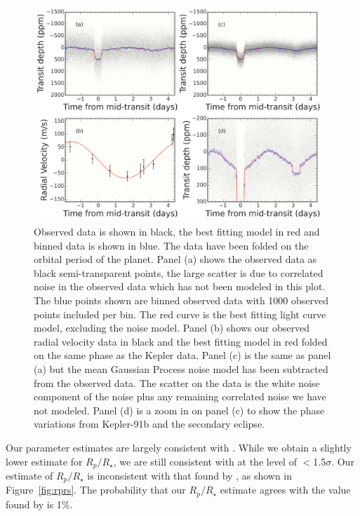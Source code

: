\documentclass[apjl]{emulateapj}
\begin{document}
\begin{figure}
\includegraphics[width=0.97\textwidth]{transitplot_4p.pdf}
\caption{Observed data is shown in black, the best fitting model in red and binned data is shown in blue. The data have been folded on the orbital period of the planet. Panel (a) shows the observed data as black semi-transparent points, the large scatter is due to correlated noise in the observed data which has not been modeled in this plot. The blue points shown are binned observed data with 1000 observed points included per bin. The red curve is the best fitting light curve model, excluding the noise model. Panel (b) shows our observed radial velocity data in black and the best fitting model in red folded on the same phase as the Kepler data. Panel (c) is the same as panel (a) but the mean Gaussian Process noise model has been subtracted from the observed data. The scatter on the data is the white noise component of the noise plus any remaining correlated noise we have not modeled. Panel (d) is a zoom in on panel (c) to show the phase variations from Kepler-91b and the secondary eclipse.}
\label{fig:results}
\end{figure}


Our parameter estimates are largely consistent with \citet{lillo14}. While we obtain a slightly lower estimate for $R_{p}/R_{\star}$, we are still consistent with \citet{lillo14} at the level of $<$1.5$\sigma$. Our estimate of $R_{p}/R_{\star}$ is inconsistent with that found by \citet{sliski14}, as shown in Figure~\ref{fig:rprs}. The probability that our $R_{p}/R_{\star}$ estimate agrees with the value found by \citet{sliski14} is 1\%.
\end{document}
